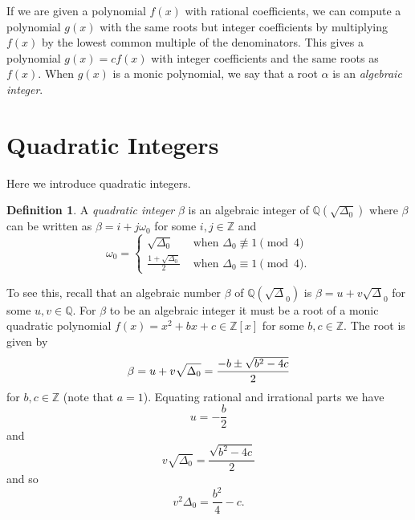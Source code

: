 \documentclass{ucalgthes1}
\theoremstyle{plain}
\theoremstyle{definition}
\newtheorem{defn}[thm]{Definition}
\newcommand{\ZZ}{\mathbb{Z}}
\newcommand{\QQ}{\mathbb{Q}}
\begin{document}
If we are given a polynomial $f(x)$ with rational coefficients, we can compute a polynomial $g(x)$ with the same roots but integer coefficients by multiplying $f(x)$ by the lowest common multiple of the denominators.  This gives a polynomial $g(x) = cf(x)$ with integer coefficients and the same roots as $f(x)$.  When $g(x)$ is a monic polynomial, we say that a root $\alpha$ is an \emph{algebraic integer}.


\bigbreak
\section{Quadratic Integers}

Here we introduce quadratic integers.

\begin{defn}
\label{defn:quadraticInteger}
A \emph{quadratic integer} $\beta$ is an algebraic integer of $\QQ(\sqrt{\Delta_0})$ where $\beta$ can be written as $\beta = i + j \omega_0$ for some $i,j \in \ZZ$ and
\begin{equation*}
	\omega_0 = \begin{cases}
		\sqrt{\Delta_0} & \textrm{ when } \Delta_0 \not \equiv 1 \pmod 4 \\
		\frac{1+\sqrt{\Delta_0}}{2} & \textrm{ when } \Delta_0 \equiv 1 \pmod 4.
	\end{cases}
\end{equation*}
\end{defn}

\noindent
To see this, recall that an algebraic number $\beta$ of $\QQ(\sqrt\Delta_0)$ is $\beta = u+v\sqrt\Delta_0$ for some $u,v \in \QQ$.  For $\beta$ to be an  algebraic integer it must be a root of a monic quadratic polynomial $f(x) = x^2+bx+c \in \ZZ[x]$ for some $b,c \in \ZZ$.  The root is given by
\begin{equation*}
	\beta = u + v\sqrt{\Delta_0} = \frac{-b \pm \sqrt{b^2-4c}}{2} \\
\end{equation*}
for $b,c \in \ZZ$ (note that $a=1$). Equating rational and irrational parts we have
\begin{equation*}
	u = -\frac{b}{2}
\end{equation*}
and
\begin{equation*}
	v \sqrt{\Delta_0} = \frac{\sqrt{b^2 -4c}}{2}
\end{equation*}
and so
\begin{equation}
\label{eq:v2}
	v^2 \Delta_0 = \frac{b^2}{4} - c.
\end{equation}
\end{document}
